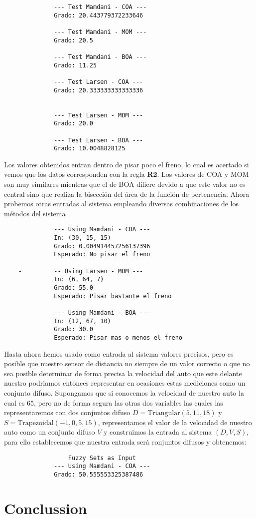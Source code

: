 \documentclass[a4paper,10pt,twocolumn]{article}
\begin{document}
\begin{verbatim}
	          --- Test Mamdani - COA --- 
	          Grado: 20.443779372233646
	
	          --- Test Mamdani - MOM --- 
	          Grado: 20.5
	
	          --- Test Mamdani - BOA --- 
	          Grado: 11.25
	
	          --- Test Larsen - COA --- 
	          Grado: 20.333333333333336
	
	
	          --- Test Larsen - MOM --- 
	          Grado: 20.0
	
	          --- Test Larsen - BOA --- 
	          Grado: 10.0048828125
\end{verbatim}

Los valores obtenidos entran dentro de pisar poco el freno, lo cual es acertado si vemos que los datos corresponden con la regla \textbf{R2}. Los valores de COA y MOM son muy similares mientras que el de BOA difiere devido a que este valor no es central sino que realiza la bisecci\'on del \'area de la funci\'on de pertenencia. Ahora probemos otras entradas al sistema empleando diversas combinaciones de los m\'etodos del sistema

\begin{verbatim}
	          --- Using Mamdani - COA --- 
	          In: (30, 15, 15) 
	          Grado: 0.004914457256137396
	          Esperado: No pisar el freno
	
	-         -- Using Larsen - MOM --- 
	          In: (6, 64, 7)
	          Grado: 55.0
	          Esperado: Pisar bastante el freno
	
	          --- Using Mamdani - BOA --- 
	          In: (12, 67, 10)
	          Grado: 30.0
	          Esperado: Pisar mas o menos el freno
\end{verbatim}

Hasta ahora hemos usado como entrada al sistema valores precisos, pero es posible que nuestro sensor de distancia no siempre de un valor correcto o que no sea posible determinar de forma precisa la velocidad del auto que este delante nuestro podriamos entonces representar en ocasiones estas mediciones como un conjunto difuso. Supongamos que si conocemos la velocidad de nuestro auto la cual es $65$, pero no de forma segura las otras dos variables las cuales las representaremos con dos conjuntos difuso $D = \text{Triangular} (5, 11, 18)$ y $S = \text{Trapezoidal} (-1, 0, 5, 15)$, representamos el valor de la velocidad de nuestro auto como un conjunto difuso $V$ y construimos la entrada al sistema $(D, V, S)$, para ello establecemos que nuestra entrada ser\'a conjuntos difusos y obtenemos:

\begin{verbatim}
	              Fuzzy Sets as Input  
	          --- Using Mamdani - COA --- 
	          Grado: 50.555553325387486
\end{verbatim}


\section*{Conclussion}\label{sec:con}

\lipsum[9-11]

\begin{thebibliography}{9}
	
\end{thebibliography}

\label{end}
\end{document}
